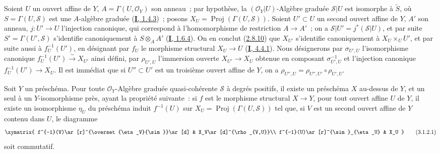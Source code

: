 \begin{env}[3.1.1]
Soient $U$ un ouvert affine de $Y$, $A=\Gamma(U,\mathcal{O}_Y)$ son anneau~;
par hypothèse, la $(\mathcal{O}_Y|U)$-Algèbre graduée $\mathcal{S}|U$ est
isomorphe à $\widetilde{S}$, où $S=\Gamma(U,\mathcal{S})$ est une
$A$-algèbre
graduée (\hyperref[I.1.4.3-fr]{\textbf{I}, 1.4.3})~; posons
$X_U=\operatorname{Proj}(\Gamma(U,\mathcal{S}))$. Soient $U'\subset U$ un
second ouvert affine de $Y$, $A'$ son anneau, $j:U'\to U$ l'injection
canonique, qui correspond à l'homomorphisme de restriction $A\to A'$~; on a
$\mathcal{S}|U'=j^*(\mathcal{S}|U)$, et par suite
$S'=\Gamma(U',\mathcal{S})$ s'identifie canoniquement à $S\otimes_A A'$
(\hyperref[I.1.6.4-fr]{\textbf{I}, 1.6.4}). On en conclut
(\hyperref[II.2.8.10-fr]{2.8.10}) que $X_{U'}$ s'identifie canoniquement à
$X_U\times_U U'$, et par suite aussi à $f_U^{-1}(U')$, en désignant par
$f_U$ le morphisme structural $X_U\to U$
(\hyperref[I.4.4.1-fr]{\textbf{I}, 4.4.1}). Nous désignerons par $\sigma_{U',U}$
l'isomorphisme canonique $f_U^{-1}(U')\xrightarrow{\sim}X_{U'}$ ainsi défini,
par $\rho_{U',U}$ l'immersion ouverte $X_{U'}\to X_U$ obtenue en composant
$\sigma_{U',U}^{-1}$ et l'injection canonique $f_U^{-1}(U')\to X_U$. Il est
immédiat que si $U''\subset U'$ est un troisième ouvert affine de $Y$, on a
$\rho_{U'',U}=\rho_{U'',U'}\circ\rho_{U',U}$.
\end{env}

\begin{proposition}[3.1.2]
\label{II.3.1.2-fr}
Soit $Y$ un préschéma. Pour toute $\mathcal{O}_Y$-Algèbre graduée
quasi-cohérente $\mathcal{S}$ à degrés positifs, il existe un préschéma $X$
au-dessus de $Y$, et un seul à un $Y$-isomorphisme près, ayant la propriété
suivante~: si $f$ est le morphisme structural $X\to Y$, pour tout ouvert
affine $U$ de $Y$, il existe un isomorphisme $\eta_U$ du préschéma
induit $f^{-1}(U)$ sur $X_U=\operatorname{Proj}(\Gamma(U,\mathcal{S}))$ tel
que, si $V$ est un second ouvert affine de $Y$ contenu dans $U$, le diagramme
\[
\label{II.3.1.2.1-fr}
  \xymatrix{
    f^{-1}(V)\ar[r]^{\overset{\eta_V}{\sim}}\ar[d]
    & X_V\ar[d]^{\rho_{V,U}}\\
    f^{-1}(U)\ar[r]^{\sim}_{\eta_U}
    & X_U
  }
\tag{3.1.2.1}
\]
soit commutatif.
\end{proposition}

